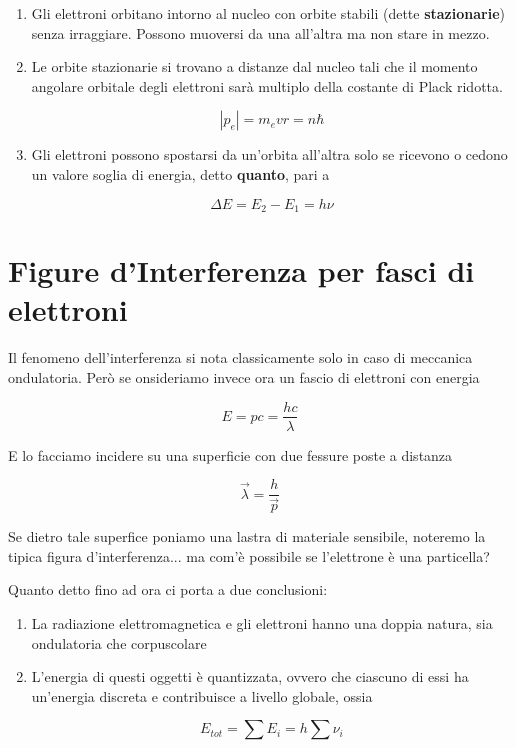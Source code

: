 \begin{enumerate}
	
	\item Gli elettroni orbitano intorno al nucleo con orbite stabili (dette \textbf{stazionarie}) senza irraggiare. Possono muoversi da una all'altra ma non stare in mezzo.
	
	\item Le orbite stazionarie si trovano a distanze dal nucleo tali che il momento angolare orbitale degli elettroni sarà multiplo della costante di Plack ridotta.
	
	\begin{equation}
	|p_e|= m_e v r= n \hbar
	\end{equation}
	
	\item Gli elettroni possono spostarsi da un'orbita all'altra solo se ricevono o cedono un valore soglia di energia, detto \textbf{quanto}, pari a 
	
	\begin{equation}
	\Delta E = E_2 - E_1 = h \nu
	\end{equation}

\end{enumerate} 

\section{Figure d'Interferenza per fasci di elettroni}

Il fenomeno dell'interferenza si nota classicamente solo in caso di meccanica ondulatoria.
Per\`o se onsideriamo invece ora un fascio di elettroni con energia 

\begin{equation}
E= pc = \frac{hc}{\lambda}
\end{equation}

E lo facciamo incidere su una superficie con due fessure poste a distanza 

\begin{equation}
\vec{\lambda}= \frac{h}{\vec{p}}
\end{equation}

Se dietro tale superfice poniamo una lastra di materiale sensibile, noteremo la tipica figura d'interferenza... ma com'è possibile se l'elettrone è una particella?

Quanto detto fino ad ora ci porta a due conclusioni:

\begin{enumerate}
	\item La radiazione elettromagnetica e gli elettroni hanno una doppia natura, sia ondulatoria che corpuscolare
	\item L'energia di questi oggetti è quantizzata, ovvero che ciascuno di essi ha un'energia discreta e contribuisce a livello globale, ossia
	
	\begin{equation}
	E_{tot}= \sum{E_i} = h\sum{\nu_i}
\end{equation}

\end{enumerate}

